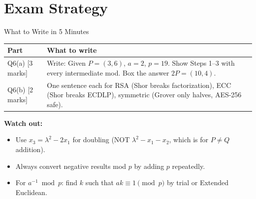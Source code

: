 \documentclass[12pt,a4paper]{article}
\begin{document}
\vspace{1em}

\section{Exam Strategy}

\begin{keybox}{What to Write in 5 Minutes}
\begin{tabular}{@{}p{3cm}p{10cm}@{}}
\toprule
\textbf{Part} & \textbf{What to write} \\
\midrule
Q6(a) [3 marks] & Write: Given $P=(3,6)$, $a=2$, $p=19$. Show Steps 1--3 with every intermediate mod. Box the answer $2P=(10,4)$. \\
Q6(b) [2 marks] & One sentence each for RSA (Shor breaks factorization), ECC (Shor breaks ECDLP), symmetric (Grover only halves, AES-256 safe). \\
\bottomrule
\end{tabular}

\medskip
\textbf{Watch out:}
\begin{itemize}[nosep]
  \item Use $x_3 = \lambda^2 - 2x_1$ for doubling (NOT $\lambda^2 - x_1 - x_2$, which is for $P \neq Q$ addition).
  \item Always convert negative results mod $p$ by adding $p$ repeatedly.
  \item For $a^{-1} \bmod p$: find $k$ such that $ak \equiv 1 \pmod{p}$ by trial or Extended Euclidean.
\end{itemize}
\end{keybox}
\end{document}
